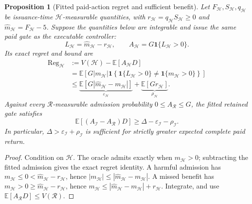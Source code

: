\documentclass[10pt]{article}
\newtheorem{proposition}{Proposition}
\begin{document}
\begin{proposition}[Fitted paid-action regret and sufficient benefit]
\label{prop:final-fitted-paid-benefit}
Let $F_{\mathcal H},S_{\mathcal H},q_{\mathcal H}$ be issuance-time
$\mathcal H$-measurable quantities, with
$r_{\mathcal H}=q_{\mathcal H}S_{\mathcal H}\geq0$ and
$\widehat m_{\mathcal H}=F_{\mathcal H}-5$.  Suppose the quantities below
are integrable and issue the same paid gate as the executable controller:
\begin{equation}
 L_{\mathcal H}=\widehat m_{\mathcal H}-r_{\mathcal H},\qquad
 A_{\mathcal H}=G\mathbf1\{L_{\mathcal H}>0\}.
 \label{eq:final-fitted-paid-gate}
\end{equation}
Its exact regret and bound are
\begin{align}
 \operatorname{Reg}_{\mathcal H}
 &:=V(\mathcal H)-\mathbb E[A_{\mathcal H}D]\nonumber\\
 &=\mathbb E\!\left[G|m_{\mathcal H}|\mathbf1\left\{
 \mathbf1\{L_{\mathcal H}>0\}\ne\mathbf1\{m_{\mathcal H}>0\}
 \right\}\right]\nonumber\\
 &\leq\underbrace{\mathbb E[G|\widehat m_{\mathcal H}-m_{\mathcal H}|]}
                 _{\varepsilon_{\mathcal H}}
       +\underbrace{\mathbb E[Gr_{\mathcal H}]}_{\rho_{\mathcal H}}.
 \label{eq:final-fitted-paid-regret}
\end{align}
Against every $\mathcal R$-measurable admission probability
$0\leq A_{\mathcal R}\leq G$, the fitted retained gate satisfies
\begin{equation}
 \mathbb E[(A_{\mathcal I}-A_{\mathcal R})D]
 \geq\Delta-\varepsilon_{\mathcal I}-\rho_{\mathcal I}.
 \label{eq:final-fitted-paid-improvement}
\end{equation}
In particular, $\Delta>\varepsilon_{\mathcal I}+\rho_{\mathcal I}$ is
sufficient for strictly greater expected complete paid return.
\end{proposition}
\begin{proof}
Condition on $\mathcal H$.  The oracle admits exactly when
$m_{\mathcal H}>0$; subtracting the fitted admission gives the exact
regret identity.  A harmful admission has
$m_{\mathcal H}\leq0<\widehat m_{\mathcal H}-r_{\mathcal H}$, hence
$|m_{\mathcal H}|\leq|\widehat m_{\mathcal H}-m_{\mathcal H}|$.
A missed benefit has
$m_{\mathcal H}>0\geq\widehat m_{\mathcal H}-r_{\mathcal H}$, hence
$m_{\mathcal H}\leq|\widehat m_{\mathcal H}-m_{\mathcal H}|+r_{\mathcal H}$.
Integrate, and use $\mathbb E[A_{\mathcal R}D]\leq V(\mathcal R)$.
\end{proof}
\end{document}
